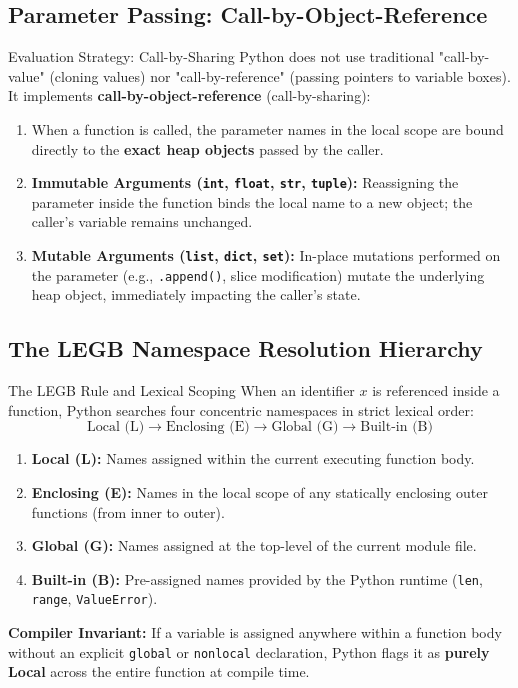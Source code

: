 \subsection{Parameter Passing: Call-by-Object-Reference}

\begin{definitionbox}{Evaluation Strategy: Call-by-Sharing}
 
Python does not use traditional "call-by-value" (cloning values) nor "call-by-reference" (passing pointers to variable boxes). It implements \textbf{call-by-object-reference} (call-by-sharing):
\begin{enumerate}
    \item When a function is called, the parameter names in the local scope are bound directly to the \textbf{exact heap objects} passed by the caller.
    \item \textbf{Immutable Arguments (\texttt{int}, \texttt{float}, \texttt{str}, \texttt{tuple}):} Reassigning the parameter inside the function binds the local name to a new object; the caller's variable remains unchanged.
    \item \textbf{Mutable Arguments (\texttt{list}, \texttt{dict}, \texttt{set}):} In-place mutations performed on the parameter (e.g., \texttt{.append()}, slice modification) mutate the underlying heap object, immediately impacting the caller's state.
\end{enumerate}
\end{definitionbox}

\subsection{The LEGB Namespace Resolution Hierarchy}

\begin{theorembox}{The LEGB Rule and Lexical Scoping}
 
When an identifier $x$ is referenced inside a function, Python searches four concentric namespaces in strict lexical order:
\begin{equation}
\text{Local (L)} \longrightarrow \text{Enclosing (E)} \longrightarrow \text{Global (G)} \longrightarrow \text{Built-in (B)}
\end{equation}
\begin{enumerate}
    \item \textbf{Local (L):} Names assigned within the current executing function body.
    \item \textbf{Enclosing (E):} Names in the local scope of any statically enclosing outer functions (from inner to outer).
    \item \textbf{Global (G):} Names assigned at the top-level of the current module file.
    \item \textbf{Built-in (B):} Pre-assigned names provided by the Python runtime (\texttt{len}, \texttt{range}, \texttt{ValueError}).
\end{enumerate}
\textbf{Compiler Invariant:} If a variable is assigned anywhere within a function body without an explicit \texttt{global} or \texttt{nonlocal} declaration, Python flags it as \textbf{purely Local} across the entire function at compile time.
\end{theorembox}

